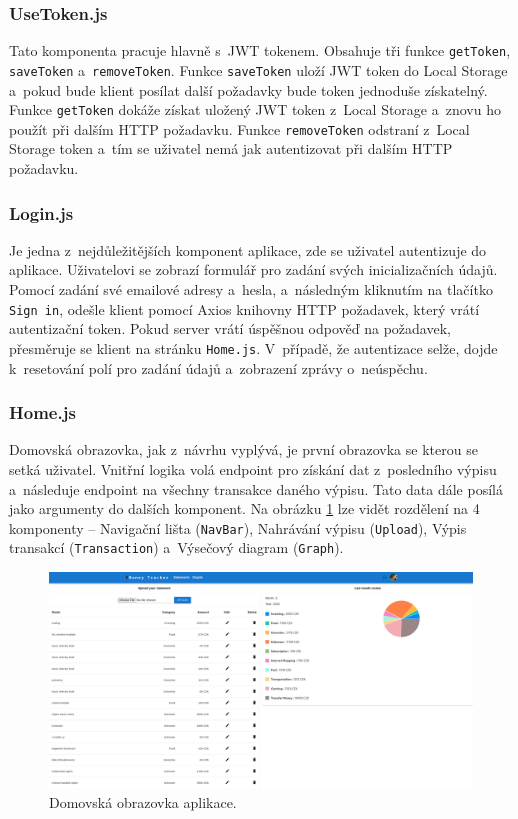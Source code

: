 \subsubsection{UseToken.js}

Tato komponenta pracuje hlavně s~JWT tokenem. Obsahuje tři funkce \texttt{getToken}, \texttt{saveToken} a~\texttt{removeToken}. Funkce \texttt{saveToken} uloží JWT token do Local Storage a~pokud bude klient posílat další požadavky bude token jednoduše získatelný. Funkce \texttt{getToken} dokáže získat uložený JWT token z~Local Storage a~znovu ho použít při dalším HTTP požadavku. Funkce \texttt{removeToken} odstraní z~Local Storage token a~tím se uživatel nemá jak autentizovat při dalším HTTP požadavku.
\subsubsection{Login.js}

Je jedna z~nejdůležitějších komponent aplikace, zde se uživatel autentizuje do aplikace. Uživatelovi se zobrazí formulář pro zadání svých inicializačních údajů. Pomocí zadání své emailové adresy a~hesla, a~následným kliknutím na tlačítko \texttt{Sign in}, odešle klient pomocí Axios knihovny HTTP požadavek, který vrátí autentizační token. Pokud server vrátí úspěšnou odpověď na požadavek, přesměruje se klient na stránku \texttt{Home.js}. V~případě, že autentizace selže, dojde k~resetování polí pro zadání údajů a~zobrazení zprávy o~neúspěchu.

\subsubsection{Home.js}
Domovská obrazovka, jak z~návrhu vyplývá, je první obrazovka se kterou se setká uživatel. Vnitřní logika volá endpoint pro získání dat z~posledního výpisu a~následuje endpoint na všechny transakce daného výpisu. Tato data dále posílá jako argumenty do dalších komponent. Na obrázku \ref{fig:homescreen} lze vidět rozdělení na 4 komponenty -- Navigační lišta (\texttt{NavBar}), Nahrávání výpisu (\texttt{Upload}), Výpis transakcí (\texttt{Transaction}) a~Výsečový diagram (\texttt{Graph}). 

\begin{figure}[ht]
    \centering
    \includegraphics[width=\textwidth]{obrazky-figures/moneyhome.png}
    \caption{Domovská obrazovka aplikace.}
    \label{fig:homescreen}
\end{figure}

